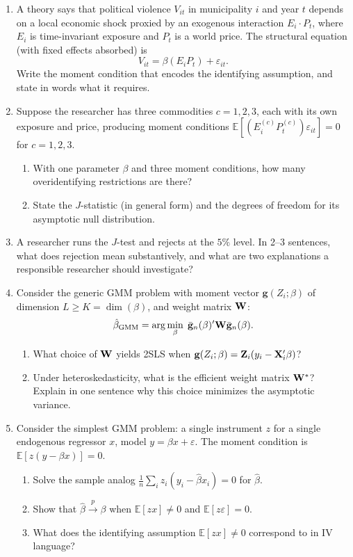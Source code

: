 \documentclass{article}
\newcommand{\E}{\mathbb{E}}
\newcommand{\pconv}{\xrightarrow{p}}
\begin{document}
\begin{enumerate}[label=\textbf{C.\arabic*},leftmargin=*,itemsep=10pt]

\item  A theory says that political violence $V_{it}$ in municipality $i$ and year $t$ depends on a local economic shock proxied by an exogenous interaction $E_i\cdot P_t$, where $E_i$ is time-invariant exposure and $P_t$ is a world price.  The structural equation (with fixed effects absorbed) is
$$V_{it} = \beta(E_i P_t) + \varepsilon_{it}.$$
Write the moment condition that encodes the identifying assumption, and state in words what it requires.

\item  Suppose the researcher has three commodities $c = 1, 2, 3$, each with its own exposure and price, producing moment conditions $\E[(E_i^{(c)} P_t^{(c)})\varepsilon_{it}] = 0$ for $c = 1, 2, 3$.
\begin{enumerate}[label=(\alph*)]
  \item With one parameter $\beta$ and three moment conditions, how many overidentifying restrictions are there?
  \item State the $J$-statistic (in general form) and the degrees of freedom for its asymptotic null distribution.
\end{enumerate}

\item  A researcher runs the $J$-test and rejects at the $5\%$ level.  In 2--3 sentences, what does rejection mean substantively, and what are two explanations a responsible researcher should investigate?

\item  Consider the generic GMM problem with moment vector $\bm g(Z_i; \beta)$ of dimension $L \geq K = \dim(\beta)$, and weight matrix ${\mathbf W}$:
$$\hat\beta_{\text{GMM}} = \arg\min_\beta\;\bar{{\mathbf g}}_n(\beta)'{\mathbf W}\bar{{\mathbf g}}_n(\beta).$$
\begin{enumerate}[label=(\alph*)]
  \item What choice of ${\mathbf W}$ yields 2SLS when $\mathbf g(Z_i; \beta) = {\mathbf Z}_i(y_i - {\mathbf X}_i'\beta)$?
  \item Under heteroskedasticity, what is the efficient weight matrix ${\mathbf W}^*$?  Explain in one sentence why this choice minimizes the asymptotic variance.
\end{enumerate}

\item  Consider the simplest GMM problem: a single instrument $z$ for a single endogenous regressor $x$, model $y = \beta x + \varepsilon$.  The moment condition is $\E[z(y - \beta x)] = 0$.
\begin{enumerate}[label=(\alph*)]
  \item Solve the sample analog $\frac{1}{n}\sum_i z_i(y_i - \hat\beta x_i) = 0$ for $\hat\beta$.
  \item Show that $\hat\beta \pconv \beta$ when $\E[zx] \neq 0$ and $\E[z\varepsilon] = 0$.
  \item What does the identifying assumption $\E[zx] \neq 0$ correspond to in IV language?
\end{enumerate}


\end{enumerate}
\end{document}
